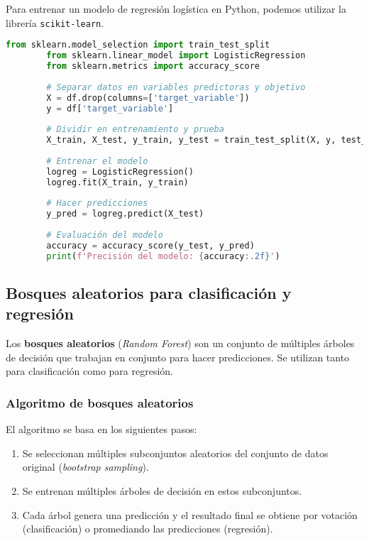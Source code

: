 \documentclass{book}
\begin{document}
	Para entrenar un modelo de regresión logística en Python, podemos utilizar la librería \texttt{scikit-learn}.
	
	\begin{lstlisting}[language=Python, caption=Entrenamiento de regresión logística]
		from sklearn.model_selection import train_test_split
		from sklearn.linear_model import LogisticRegression
		from sklearn.metrics import accuracy_score
		
		# Separar datos en variables predictoras y objetivo
		X = df.drop(columns=['target_variable'])
		y = df['target_variable']
		
		# Dividir en entrenamiento y prueba
		X_train, X_test, y_train, y_test = train_test_split(X, y, test_size=0.2, random_state=42)
		
		# Entrenar el modelo
		logreg = LogisticRegression()
		logreg.fit(X_train, y_train)
		
		# Hacer predicciones
		y_pred = logreg.predict(X_test)
		
		# Evaluación del modelo
		accuracy = accuracy_score(y_test, y_pred)
		print(f'Precisión del modelo: {accuracy:.2f}')
	\end{lstlisting}
	
	\subsection{Bosques aleatorios para clasificación y regresión}
	
	Los \textbf{bosques aleatorios} (\textit{Random Forest}) son un conjunto de múltiples árboles de decisión que trabajan en conjunto para hacer predicciones. Se utilizan tanto para clasificación como para regresión.
	
	\subsubsection{Algoritmo de bosques aleatorios}
	
	El algoritmo se basa en los siguientes pasos:
	\begin{enumerate}
		\item Se seleccionan múltiples subconjuntos aleatorios del conjunto de datos original (\textit{bootstrap sampling}).
		\item Se entrenan múltiples árboles de decisión en estos subconjuntos.
		\item Cada árbol genera una predicción y el resultado final se obtiene por votación (clasificación) o promediando las predicciones (regresión).
	\end{enumerate}
	
\end{document}

